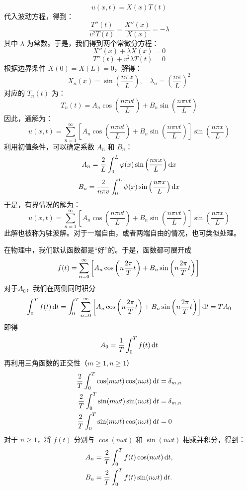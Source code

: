 \begin{prove}[波动方程在不同边界条件下的求解]
    \[
        u(x, t) = X(x)T(t)
    \]
    代入波动方程，得到：
    \[
        \frac{T''(t)}{v^2 T(t)} = \frac{X''(x)}{X(x)} = -\lambda
    \]
    其中 \(\lambda\) 为常数。于是，我们得到两个常微分方程：
    \[
        X''(x) + \lambda X(x) = 0
    \]
    \[
        T''(t) + v^2 \lambda T(t) = 0
    \]
    根据边界条件 \(X(0) = X(L) = 0\)，解得：
    \[
        X_n(x) = \sin\left(\frac{n\pi x}{L}\right), \quad \lambda_n = \left(\frac{n\pi}{L}\right)^2
    \]
    对应的 \(T_n(t)\) 为：
    \[
        T_n(t) = A_n \cos\left(\frac{n\pi v t}{L}\right) + B_n \sin\left(\frac{n\pi v t}{L}\right)
    \]
    因此，通解为：
    \[
        u(x, t) = \sum_{n=1}^\infty \left[ A_n \cos\left(\frac{n\pi v t}{L}\right) + B_n \sin\left(\frac{n\pi v t}{L}\right) \right] \sin\left(\frac{n\pi x}{L}\right)
    \]
    利用初值条件，可以确定系数 \(A_n\) 和 \(B_n\)：
    \[
        A_n = \frac{2}{L} \int_0^L \varphi(x) \sin\left(\frac{n\pi x}{L}\right) \dif x
    \]
    \[
        B_n = \frac{2}{n\pi v} \int_0^L \psi(x) \sin\left(\frac{n\pi x}{L}\right) \dif x
    \]
    于是，有界情况的解为：
    \[
        u(x, t) = \sum_{n=1}^\infty \left[ A_n \cos\left(\frac{n\pi v t}{L}\right) + B_n \sin\left(\frac{n\pi v t}{L}\right) \right] \sin\left(\frac{n\pi x}{L}\right)
    \]
    此解也被称为驻波解。对于一端自由，或者两端自由的情况，也可类似处理。
\end{prove}

\begin{prove}[傅里叶级数]
    在物理中，我们默认函数都是“好”的。于是，函数都可展开成
    \[
        f(t) = \sum_{n=0}^{\infty} \left[A_n \cos \left(n\frac{2\pi}{T} t\right)+B_n \sin \left(n\frac{2\pi}{T} t\right)\right]\\
    \]
    对于\(A_0\)，我们在两侧同时积分
    \[
        \int^T_0 f(t) \dif t = \int^T_0\sum_{n=0}^{\infty} \left[A_n \cos \left(n\frac{2\pi}{T} t\right)+B_n \sin \left(n\frac{2\pi}{T} t\right)\right]\dif t=TA_0\\
    \]
    即得
    \[
        A_0=\frac{1}{T}\int^T_0f(t)\dif t
    \]
    再利用三角函数的正交性（\(m \geq 1, n \geq 1\)）
    \[
        \begin{aligned}
            \frac{2}{T}\int^T_0\cos (m\omega t)\cos (n\omega t)\dif t & =\delta_{m,n} \\
            \frac{2}{T}\int^T_0\sin (m\omega t)\sin (n\omega t)\dif t & =\delta_{m,n} \\
            \frac{2}{T}\int^T_0\sin (m\omega t)\cos (n\omega t)\dif t & =0
        \end{aligned}
    \]
    对于 \(n \geq 1\)，将 \(f(t)\) 分别与 \(\cos(n\omega t)\) 和 \(\sin(n\omega t)\) 相乘并积分，得到：
    \[
        \begin{aligned}
            A_n & = \frac{2}{T} \int^T_0 f(t) \cos(n\omega t) \dif t, \\
            B_n & = \frac{2}{T} \int^T_0 f(t) \sin(n\omega t) \dif t.
        \end{aligned}
    \]
\end{prove}

